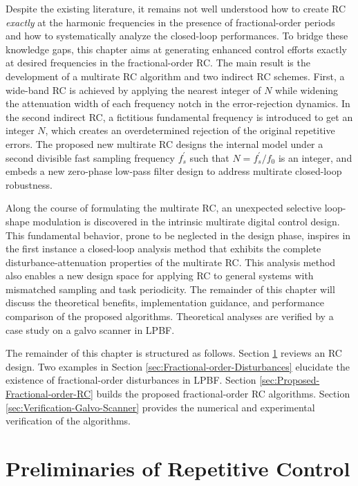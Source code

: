 \documentclass [11pt, proquest] {uwthesis}[2020/02/24]
\begin{document}
Despite the existing literature, it remains not well understood how
to create RC \emph{exactly} at the harmonic frequencies in the presence
of fractional-order periods and how to systematically analyze the
closed-loop performances. To bridge these knowledge gaps, this chapter
aims at generating enhanced control efforts exactly at desired frequencies
in the fractional-order RC. The main result is the development of
a multirate RC algorithm and two indirect RC schemes. First, a wide-band
RC is achieved by applying the nearest integer of $N$ while widening
the attenuation width of each frequency notch in the error-rejection
dynamics. In the second indirect RC, a fictitious fundamental frequency
is introduced to get an integer $N$, which creates an overdetermined
rejection of the original repetitive errors. The proposed new multirate
RC designs the internal model under a second divisible fast sampling
frequency $f_{s}^{'}$ such that $N=f_{s}^{'}/f_{0}$ is an integer,
and embeds a new zero-phase low-pass filter design to address multirate
closed-loop robustness.

Along the course of formulating the multirate RC, an unexpected selective
loop-shape modulation is discovered in the intrinsic multirate digital
control design. This fundamental behavior, prone to be neglected in
the design phase, inspires in the first instance a closed-loop analysis
method that exhibits the complete disturbance-attenuation properties
of the multirate RC. This analysis method also enables a new design
space for applying RC to general systems with mismatched sampling
and task periodicity. The remainder of this chapter will discuss the
theoretical benefits, implementation guidance, and performance comparison
of the proposed algorithms. Theoretical analyses are verified by a
case study on a galvo scanner in LPBF.

The remainder of this chapter is structured as follows. Section \ref{sec:Repetitve-Control}
 reviews an RC design. Two examples in Section \ref{sec:Fractional-order-Disturbances}
elucidate the existence
of fractional-order disturbances in LPBF. Section \ref{sec:Proposed-Fractional-order-RC}
builds the proposed fractional-order RC algorithms. Section \ref{sec:Verification-Galvo-Scanner}
provides the numerical and experimental verification of the algorithms.

\section{Preliminaries of Repetitive Control} \label{sec:Repetitve-Control}
\end{document}

